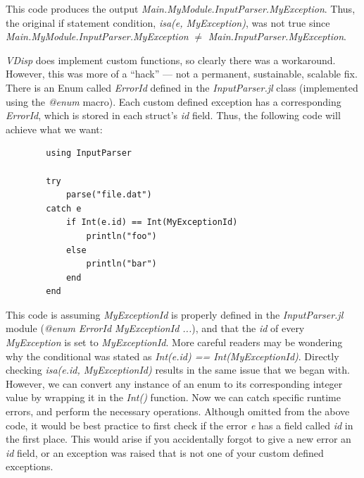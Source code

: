 \documentclass[11pt,fleqn]{article}
\newcommand{\indentpar}{\phantom{=}}
\begin{document}
        \indentpar This code produces the output \emph{Main.MyModule.InputParser.MyException}. Thus, the original
        if statement condition, \emph{isa(e, MyException)}, was not true since \emph{Main.MyModule.InputParser.MyException}
        $\not =$ \emph{Main.InputParser.MyException}.

        \indentpar \emph{VDisp} does implement custom functions, so clearly there was a workaround. However,
        this was more of a “hack” — not a permanent, sustainable, scalable fix. There is an Enum called \emph{ErrorId}
        defined in the \emph{InputParser.jl} class (implemented using the \emph{@enum} macro). Each custom defined 
        exception has a corresponding \emph{ErrorId}, which is stored in each struct's \emph{id} field. Thus, the following
        code will achieve what we want:

        \begin{verbatim}
        using InputParser
        
        try
            parse("file.dat")
        catch e
            if Int(e.id) == Int(MyExceptionId)
                println("foo")
            else
                println("bar")
            end
        end
        \end{verbatim}

        \indentpar This code is assuming \emph{MyExceptionId} is properly defined in the \emph{InputParser.jl}
        module (\emph{@enum ErrorId MyExceptionId ...}), and that the \emph{id} of every \emph{MyException} is 
        set to \emph{MyExceptionId}. More careful readers may be wondering why the conditional was stated as 
        \emph{Int(e.id) == Int(MyExceptionId)}. Directly checking \emph{isa(e.id, MyExceptionId)} results in the
        same issue that we began with. However, we can convert any instance of an enum to its corresponding integer 
        value by wrapping it in the \emph{Int()} function. Now we can catch specific runtime errors, and perform the 
        necessary operations. Although omitted from the above code, it would be best practice to first check if 
        the error \emph{e} has a field called \emph{id} in the first place. This would arise if you accidentally forgot 
        to give a new error an \emph{id} field, or an exception was raised that is not one of your custom defined exceptions.   
        
\end{document}
